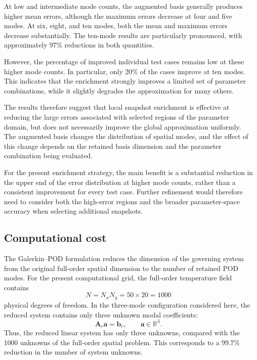 At low and intermediate mode counts, the augmented
basis generally produces higher mean errors, although
the maximum errors decrease at four and five modes.
At six, eight, and ten modes, both the mean and
maximum errors decrease substantially. The
ten-mode results are particularly pronounced, with
approximately 97\% reductions in both quantities.

However, the percentage of improved individual
test cases remains low at these higher mode counts.
In particular, only 20\% of the cases improve at
ten modes. This indicates that the enrichment
strongly improves a limited set of parameter
combinations, while it slightly degrades the
approximation for many others.

The results therefore suggest that local snapshot
enrichment is effective at reducing the large
errors associated with selected regions of the
parameter domain, but does not necessarily improve
the global approximation uniformly. The augmented
basis changes the distribution of spatial modes,
and the effect of this change depends on the
retained basis dimension and the parameter
combination being evaluated.

For the present enrichment strategy, the main
benefit is a substantial reduction in the upper
end of the error distribution at higher mode
counts, rather than a consistent improvement for
every test case. Further refinement would therefore
need to consider both the high-error regions and
the broader parameter-space accuracy when selecting
additional snapshots.


\subsection{Computational cost}
\label{subsec:computational_cost}

The Galerkin--POD formulation reduces the dimension of
the governing system from the original full-order spatial
dimension to the number of retained POD modes. For the
present computational grid, the full-order temperature
field contains
\[
N=N_xN_y=50\times20=1000
\]
physical degrees of freedom. In the three-mode
configuration considered here, the reduced system
contains only three unknown modal coefficients:
\[
\mathbf{A}_r\mathbf{a}=\mathbf{b}_r,
\qquad
\mathbf{a}\in\mathbb{R}^{3}.
\]
Thus, the reduced linear system has only three unknowns,
compared with the 1000 unknowns of the full-order
spatial problem. This corresponds to a 99.7\% reduction
in the number of system unknowns.

